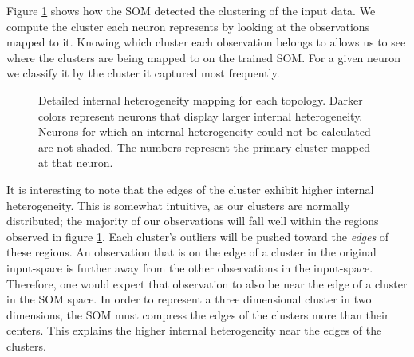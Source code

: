 Figure \ref{cluster} shows how the SOM detected the clustering of the input
data.  We compute the cluster each neuron represents by looking at the
observations mapped to it.  Knowing which cluster each observation belongs to
allows us to see where the clusters are being mapped to on the trained SOM. For a
given neuron we classify it by the cluster it captured most frequently. 

\begin{figure}[htb]
\centering
\begin{minipage}{\textwidth}
\caption{Detailed internal heterogeneity mapping for each topology. Darker colors
represent neurons that display larger internal heterogeneity. Neurons for which
an internal heterogeneity could not be calculated are not shaded. The numbers
represent the primary cluster mapped at that neuron.}
\label{cluster}
\end{minipage}
\end{figure}

It is interesting to note that the edges of the cluster exhibit higher internal heterogeneity.  
This is somewhat intuitive, as our clusters are normally distributed; the
majority of our observations will fall well within the regions observed in
figure \ref{cluster}. Each cluster's outliers will be pushed toward the
\emph{edges} of these regions. An observation that is on the edge of a cluster
in the original input-space is further away from the other observations in the
input-space.  Therefore, one would expect that observation to also be near the
edge of a cluster in the SOM space.  In order to represent a three dimensional
cluster in two dimensions, the SOM must compress the edges of the clusters
more than their centers.  This explains the higher internal heterogeneity near
the edges of the clusters. 


